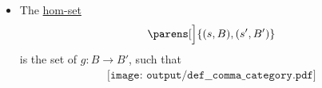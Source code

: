\begin{definition}
\begin{thmenum}
\begin{minipage}[t]{0.43\textwidth}
\begin{itemize}
        \item The \hyperref[def:category/morphisms]{hom-set}
        \begin{equation*}
          [X \downarrow G]\parens[\Big]{ (s, B), (s', B') }
        \end{equation*}
        is the set of \( g: B \to B' \), such that
        \begin{equation}\label{eq:def:comma_category/fixed/left}
          \begin{aligned}
            \texttt{[image: output/def\_\_comma\_category.pdf]}
          \end{aligned}
        \end{equation}
      \end{itemize}
    \end{minipage}
  \end{thmenum}
\end{definition}

